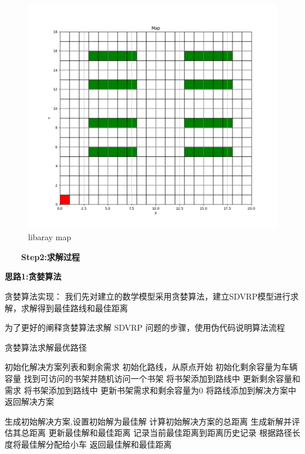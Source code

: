 \documentclass[withoutpreface,bwprint]{thesis-config}
\begin{document}
\begin{figure}[htbp]
    \centering
    \includegraphics[width=0.5\linewidth]{figures/result1.1.png}
    \caption{libaray map}
\end{figure}

\par \quad ~~~~\textbf{Step2:求解过程} 
\par \textbf{思路1:贪婪算法}
\par 贪婪算法实现：
我们先对建立的数学模型采用贪婪算法，建立SDVRP模型进行求解，求解得到最佳路线和最佳距离
\par 为了更好的阐释贪婪算法求解 SDVRP 问题的步骤，使用伪代码说明算法流程
\begin{breakablealgorithm}
    \caption{贪婪算法求解最优路径}
    \begin{algorithmic}[1]

            \State 初始化解决方案列表和剩余需求
                \State 初始化路线，从原点开始
                \State 初始化剩余容量为车辆容量
                    \State 找到可访问的书架并随机访问一个书架
                        \State 将书架添加到路线中
                        \State 更新剩余容量和需求
                    \Else
                        \State 将书架添加到路线中
                        \State 更新书架需求和剩余容量为0
                    \EndIf
                \EndWhile
                \State 将路线添加到解决方案中
            \EndWhile
            \State 返回解决方案
        \EndFunction

        \State

            \State 生成初始解决方案,设置初始解为最佳解
            \State 计算初始解决方案的总距离
                \State 生成新解并评估其总距离
                    \State 更新最佳解和最佳距离
                \EndIf
                \State 记录当前最佳距离到距离历史记录
            \EndFor
            \State 根据路径长度将最佳解分配给小车
            \State 返回最佳解和最佳距离
        \EndFunction   
    \end{algorithmic}
\end{breakablealgorithm}
\end{document}
